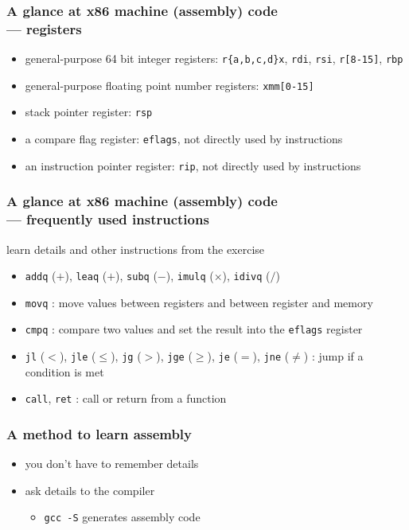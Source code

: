 \documentclass[12pt,dvipdfmx]{beamer}
\newcommand{\ao}[1]{{\color{blue}#1}}
\begin{document}
\begin{frame}
  \frametitle{A glance at x86 machine (assembly) code \\
  --- registers}
\begin{itemize}
\item general-purpose 64 bit integer registers:
  \ao{\tt r\{a,b,c,d\}x}, \ao{\tt rdi}, \ao{\tt rsi}, \ao{\tt r[8-15]},
  \ao{\tt rbp}
\item general-purpose floating point number registers:
  \ao{\tt xmm[0-15]}
\item stack pointer register: \ao{\tt rsp}
\item a compare flag register: \ao{\tt eflags},
  not directly used by instructions
\item an instruction pointer register: \ao{\tt rip},
  not directly used by instructions
\end{itemize}
\end{frame}

\begin{frame}
  \frametitle{A glance at x86 machine (assembly) code \\
  --- frequently used instructions}
learn details and other instructions from the exercise    
\begin{itemize}
\item \ao{\tt addq} ($+$), \ao{\tt leaq} ($+$), \ao{\tt subq} ($-$), \ao{\tt imulq} ($\times$), \ao{\tt idivq} ($/$)
\item \ao{\tt movq} : move values between registers and between register and memory
\item \ao{\tt cmpq} : compare two values and set the result into
  the \ao{\tt eflags} register
\item \ao{\tt jl} ($<$), \ao{\tt jle} ($\leq$), \ao{\tt jg} ($>$),
  \ao{\tt jge} ($\geq$), \ao{\tt je} ($=$), \ao{\tt jne} ($\neq$) :
  jump if a condition is met
\item \ao{\tt call}, \ao{\tt ret} : call or return from a function
\end{itemize}
\end{frame}
    
\begin{frame}
  \frametitle{A method to learn assembly}
  \begin{itemize}
  \item you don't have to remember details
  \item ask details to the compiler
    \begin{itemize}
    \item {\tt gcc -S} generates assembly code
    \end{itemize}
  \end{itemize}
\end{frame}
\fi
\end{document}
